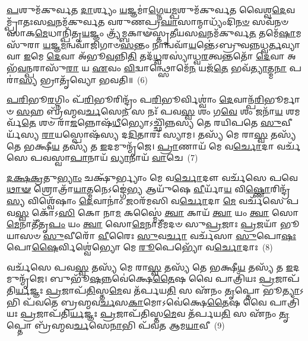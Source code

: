 \-\ul{𑌪}\-𑌶𑍁𑌮᳴𑌕𑍁𑌰𑍍𑌵𑌤 \ul{𑌦𑌾}\-𑌰𑍍𑌶𑍍𑌯𑌂 \ul{𑌯}\-𑌜𑍍𑌞𑌮𑌾॑\-\ul{𑌗𑍍𑌨𑍇}\-𑌯\-\ul{𑌮𑍍𑌪}\-𑌶𑍁𑌮᳴𑌕𑍁𑌰𑍍𑌵𑌤 𑌵𑍈𑌶𑍍𑌵\-\ul{𑌦𑍇}\-𑌵𑌮𑍍𑌪𑍍𑌰𑌾᳴𑌤𑌃𑌸\-\ul{𑌵}\-𑌨𑌮᳴𑌕𑍁𑌰𑍍𑌵𑌤 𑌵𑌰𑍁𑌣𑌪𑍍𑌰\-\ul{𑌘𑌾}\-𑌸𑌾𑌨𑍍𑌮𑌾𑌧𑍍𑌯𑌂᳴𑌦𑌿\-\ul{𑌨}\-\-\ul{𑍞} 𑌸𑌵᳴𑌨𑍞 𑌸𑌾𑌕\-\ul{𑌮𑍇}\-𑌧𑌾𑌨𑍍𑌪𑌿᳴𑌤𑍃\-\ul{𑌯}\-𑌜𑍍𑌞𑌂 𑌤𑍍𑌰𑍍𑌯᳴𑌮𑍍𑌬𑌕𑌾𑍟𑌸𑍍𑌤𑍃𑌤𑍀𑌯𑌸\-\ul{𑌵}\-𑌨𑌮᳴𑌕𑍁𑌰𑍍𑌵\-\ul{𑌤} 𑌤𑌮𑍇᳴\-\ul{𑌷𑌾}\-𑌮𑌸𑍁᳴𑌰𑌾 \ul{𑌯}\-𑌜𑍍𑌞\-\ul{𑌮}\-𑌨𑍍𑌵𑌵𑌾᳴𑌜𑌿𑌗𑌾𑍞\-\ul{𑌸}\-𑌨𑍍𑌤𑌂 𑌨𑌾𑌨𑍍𑌵𑌵𑌾᳴\-\ul{𑌯}\-𑌨𑍍𑌤𑍇॑\-𑌽𑌬𑍍𑌰𑍁𑌵𑌨𑍍𑌨𑌧𑍍𑌵\-\ul{𑌰𑍍𑌤}\-𑌵𑍍𑌯𑌾 𑌵𑌾 \ul{𑌇}\-𑌮𑍇 \ul{𑌦𑍇}\-𑌵𑌾 𑌅᳴𑌭𑍂\-\ul{𑌵}\-𑌨𑍍𑌨𑌿\-\ul{𑌤𑌿} 𑌤𑌦᳴\-\ul{𑌧𑍍𑌵}\-𑌰𑌸𑍍𑌯𑌾॑𑌧𑍍𑌵\-\ul{𑌰}\-𑌤𑍍𑌵𑌨𑍍𑌤𑌤𑍋᳴ \ul{𑌦𑍇}\-𑌵𑌾 𑌅𑌭᳴\-\ul{𑌵}\-𑌨𑍍𑌪𑌰𑌾𑌸𑍁᳴\-\ul{𑌰𑌾} 𑌯 \ul{𑌏}\-𑌵𑌂 \ul{𑌵𑌿}\-𑌦𑍍𑌵𑌾𑌨𑍍𑌥𑍍𑌸𑍋𑌮𑍇᳴\-\ul{𑌨} 𑌯𑌜᳴\-\ul{𑌤𑍇} 𑌭𑌵᳴\-\ul{𑌤𑍍𑌯𑌾}\-𑌤𑍍𑌮\-\ul{𑌨𑌾} 𑌪𑌰𑌾॑\-\ul{𑌸𑍍𑌯} 𑌭𑍍𑌰𑌾𑌤𑍃᳴𑌵𑍍𑌯𑍋 𑌭𑌵𑌤𑌿॥~(6)

{\anuvakamend[{𑌅𑌪᳴𑌶𑍍𑌯𑌨𑍍𑌤𑍋\-𑌽𑌗𑍍𑌨𑍀\-\ul{𑌷𑍋}\-𑌮𑍀𑌯᳴\-\ul{𑌮𑌾}\-𑌤𑍍𑌮\-\ul{𑌨𑌾} 𑌪\-\ul{𑌰𑌾} 𑌤𑍍𑌰𑍀𑌣𑌿᳴ 𑌚}]}%

\-\ul{𑌪}\-\-\ul{𑌰𑌿}\-𑌭𑍂\-\ul{𑌰}\-𑌗𑍍𑌨𑌿𑌂 𑌪᳴\-\ul{𑌰𑌿}\-𑌭𑍂𑌰𑌿𑌨𑍍𑌦𑍍𑌰𑌂᳴ 𑌪\-\ul{𑌰𑌿}\-𑌭𑍂𑌰𑍍𑌵𑌿𑌶𑍍𑌵𑌾𑌂॑ \ul{𑌦𑍇}\-𑌵𑌾𑌨𑍍𑌪᳴\-\ul{𑌰𑌿}\-𑌭𑍂𑌰𑍍𑌮𑌾𑍞 \ul{𑌸}\-𑌹 𑌬𑍍𑌰᳴𑌹𑍍𑌮𑌵\-\ul{𑌰𑍍𑌚}\-𑌸𑍇\-\ul{𑌨} 𑌸 𑌨𑌃᳴ 𑌪𑌵\-\ul{𑌸𑍍𑌵} 𑌶𑌂 𑌗\-\ul{𑌵𑍇} 𑌶𑌂 𑌜𑌨𑌾᳴\-\ul{𑌯} 𑌶𑌮𑌰𑍍𑌵᳴\-\ul{𑌤𑍇} 𑌶𑍞 𑌰𑌾᳴\-\ul{𑌜}\-𑌨𑍍𑌨𑍋𑌷᳴\-\ul{𑌧𑍀}\-𑌭𑍍𑌯𑍋\-𑌽𑌚𑍍𑌛𑌿᳴𑌨𑍍𑌨𑌸𑍍𑌯 𑌤𑍇 𑌰𑌯𑌿𑌪𑌤𑍇 \ul{𑌸𑍁}\-𑌵𑍀𑌰𑍍𑌯᳴𑌸𑍍𑌯 \ul{𑌰𑌾}\-𑌯𑌸𑍍𑌪𑍋𑌷᳴𑌸𑍍𑌯 𑌦\-\ul{𑌦𑌿}\-𑌤𑌾𑌰𑌃᳴ 𑌸𑍍𑌯𑌾𑌮। 𑌤𑌸𑍍𑌯᳴ 𑌮𑍇 𑌰𑌾\-\ul{𑌸𑍍𑌵} 𑌤𑌸𑍍𑌯᳴ 𑌤𑍇 𑌭𑌕𑍍𑌷𑍀\-\ul{𑌯} 𑌤𑌸𑍍𑌯᳴ 𑌤 \ul{𑌇}\-𑌦𑌮𑍁𑌨𑍍𑌮𑍃᳴𑌜𑍇। \ul{𑌪𑍍𑌰𑌾}\-𑌣𑌾𑌯᳴ 𑌮𑍇 𑌵\-\ul{𑌰𑍍𑌚𑍋}\-𑌦𑌾 𑌵𑌰𑍍𑌚᳴𑌸𑍇 𑌪𑌵𑌸𑍍𑌵𑌾\-\ul{𑌪𑌾}\-𑌨𑌾𑌯᳴ \ul{𑌵𑍍𑌯𑌾}\-𑌨𑌾𑌯᳴ \ul{𑌵𑌾}\-𑌚𑍇~(7)

\-\ul{𑌦}\-\-\ul{𑌕𑍍𑌷}\-\-\ul{𑌕𑍍𑌰}\-𑌤𑍁\-\ul{𑌭𑍍𑌯𑌾𑌂} 𑌚𑌕𑍍𑌷𑍁᳴𑌰𑍍𑌭𑍍𑌯𑌾𑌂 𑌮𑍇 𑌵\-\ul{𑌰𑍍𑌚𑍋}\-𑌦𑍗 𑌵𑌰𑍍𑌚᳴𑌸𑍇 𑌪𑌵𑍇\-\ul{𑌥𑌾}\-\-\ul{𑍟} 𑌶𑍍𑌰𑍋𑌤𑍍𑌰𑌾᳴\-\ul{𑌯𑌾}\-𑌤𑍍𑌮𑌨𑍇\-𑌽𑌙𑍍𑌗𑍇॑\-\ul{𑌭𑍍𑌯} 𑌆𑌯𑍁᳴𑌷𑍇 \ul{𑌵𑍀}\-𑌰𑍍𑌯𑌾᳴\-\ul{𑌯} 𑌵𑌿\-\ul{𑌷𑍍𑌣𑍋}\-𑌰𑌿𑌨𑍍𑌦𑍍𑌰᳴\-\ul{𑌸𑍍𑌯} 𑌵𑌿𑌶𑍍𑌵𑍇᳴𑌷𑌾𑌂 \ul{𑌦𑍇}\-𑌵𑌾𑌨𑌾𑌂॑ \ul{𑌜}\-𑌠𑌰᳴𑌮𑌸𑌿 𑌵\-\ul{𑌰𑍍𑌚𑍋}\-𑌦𑌾 \ul{𑌮𑍇} 𑌵𑌰𑍍𑌚᳴𑌸𑍇 𑌪𑌵\-\ul{𑌸𑍍𑌵} 𑌕𑍋᳴\-𑌽\-\ul{𑌸𑌿} 𑌕𑍋 𑌨𑌾\-\ul{𑌮} 𑌕𑌸𑍍𑌮𑍈॑ \ul{𑌤𑍍𑌵𑌾} 𑌕𑌾𑌯᳴ \ul{𑌤𑍍𑌵𑌾} 𑌯𑌂 \ul{𑌤𑍍𑌵𑌾} 𑌸𑍋\-\ul{𑌮𑍇}\-𑌨𑌾𑌤𑍀᳴𑌤𑍃\-\ul{𑌪𑌂} 𑌯𑌂 \ul{𑌤𑍍𑌵𑌾} 𑌸𑍋\-\ul{𑌮𑍇}\-𑌨𑌾𑌮𑍀᳴𑌮𑌦𑍞 𑌸𑍁\-\ul{𑌪𑍍𑌰}\-𑌜𑌾𑌃 \ul{𑌪𑍍𑌰}\-𑌜𑌯𑌾᳴ 𑌭𑍂𑌯𑌾𑌸𑍞 \ul{𑌸𑍁}\-𑌵𑍀𑌰𑍋᳴ \ul{𑌵𑍀}\-𑌰𑍈𑌃 \ul{𑌸𑍁}\-𑌵\-\ul{𑌰𑍍𑌚𑌾} 𑌵𑌰𑍍𑌚᳴𑌸𑌾 \ul{𑌸𑍁}\-𑌪𑍋\-\ul{𑌷𑌃} 𑌪𑍋\-\ul{𑌷𑍈}\-𑌰𑍍𑌵𑌿𑌶𑍍𑌵𑍇॑𑌭𑍍𑌯𑍋 𑌮𑍇 \ul{𑌰𑍂}\-𑌪𑍇𑌭𑍍𑌯𑍋᳴ 𑌵\-\ul{𑌰𑍍𑌚𑍋}\-𑌦𑌾𑌃~(8)

𑌵𑌰𑍍𑌚᳴𑌸𑍇 𑌪𑌵\-\ul{𑌸𑍍𑌵} 𑌤𑌸𑍍𑌯᳴ 𑌮𑍇 𑌰𑌾\-\ul{𑌸𑍍𑌵} 𑌤𑌸𑍍𑌯᳴ 𑌤𑍇 𑌭𑌕𑍍𑌷𑍀\-\ul{𑌯} 𑌤𑌸𑍍𑌯᳴ 𑌤 \ul{𑌇}\-𑌦𑌮𑍁𑌨𑍍𑌮𑍃᳴𑌜𑍇। 𑌬𑍁𑌭𑍂᳴\-\ul{𑌷}\-𑌨𑍍𑌨𑌵𑍇॑𑌕𑍍𑌷𑍇\-\ul{𑌤𑍈}\-𑌷 𑌵𑍈 𑌪𑌾𑌤𑍍𑌰𑌿᳴𑌯𑌃 \ul{𑌪𑍍𑌰}\-𑌜𑌾𑌪᳴𑌤𑌿\-\ul{𑌰𑍍𑌯}\-𑌜𑍍𑌞𑌃 \ul{𑌪𑍍𑌰}\-𑌜𑌾𑌪᳴\-\ul{𑌤𑌿}\-𑌸𑍍𑌤\-\ul{𑌮𑍇}\-𑌵 𑌤᳴𑌰𑍍𑌪𑌯\-\ul{𑌤𑌿} 𑌸 𑌏᳴𑌨𑌂 \ul{𑌤𑍃}\-𑌪𑍍𑌤𑍋 𑌭𑍂\-\ul{𑌤𑍍𑌯𑌾}\-\-𑌽𑌭𑌿 𑌪᳴𑌵𑌤𑍇 𑌬𑍍𑌰𑌹𑍍𑌮𑌵\-\ul{𑌰𑍍𑌚}\-𑌸\-\ul{𑌕𑌾}\-𑌮𑍋\-𑌽𑌵𑍇॑𑌕𑍍𑌷𑍇\-\ul{𑌤𑍈}\-𑌷 𑌵𑍈 𑌪𑌾𑌤𑍍𑌰𑌿᳴𑌯𑌃 \ul{𑌪𑍍𑌰}\-𑌜𑌾𑌪᳴𑌤𑌿\-\ul{𑌰𑍍𑌯}\-𑌜𑍍𑌞𑌃 \ul{𑌪𑍍𑌰}\-𑌜𑌾𑌪᳴𑌤𑌿𑌸𑍍𑌤\-\ul{𑌮𑍇}\-𑌵 𑌤᳴𑌰𑍍𑌪𑌯\-\ul{𑌤𑌿} 𑌸 𑌏᳴𑌨𑌂 \ul{𑌤𑍃}\-𑌪𑍍𑌤𑍋 𑌬𑍍𑌰᳴𑌹𑍍𑌮𑌵\-\ul{𑌰𑍍𑌚}\-𑌸𑍇\-\ul{𑌨𑌾}\-𑌭𑌿 𑌪᳴𑌵𑌤 𑌆𑌮\-\ul{𑌯𑌾}\-𑌵𑍀~(9)

